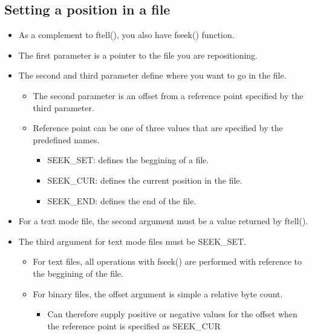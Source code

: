 \subsection{Setting a position in a file}
\begin{itemize}
    \item As a complement to ftell(), you also have fseek() function.
    
    \item The first parameter is a pointer to the file you are repositioning.
    \item The second and third parameter define where you want to go in the file. 
        \begin{itemize}
            \item The second parameter is an offset from a reference point specified by the third parameter. 
            \item Reference point can be one of three values that are specified by the predefined names.
                \begin{itemize}
                    \item SEEK\_SET: defines the beggining of a file. 
                    \item SEEK\_CUR: defines the current position in the file.
                    \item SEEK\_END: defines the end of the file.
                \end{itemize}
        \end{itemize}
    
    \item For a text mode file, the second argument must be a value returned by ftell().
    \item The third argument for text mode files must be SEEK\_SET.
        \begin{itemize}
            \item For text files, all operations with fseek() are performed with reference to the beggining of the file. 
            \item For binary files, the offset argument is simple a relative byte count. 
                \begin{itemize}
                    \item Can therefore supply positive or negative values for the offset when the reference point is specified as SEEK\_CUR
                \end{itemize}
        \end{itemize}
\end{itemize}

